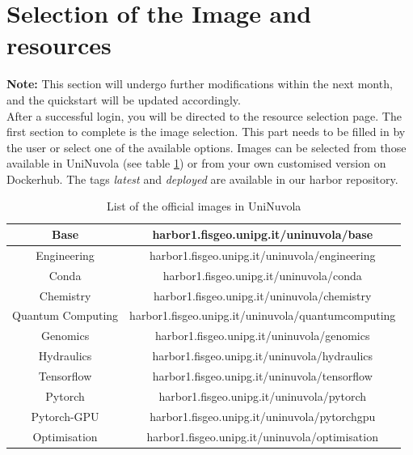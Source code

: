 \section{Selection of the Image and resources}

\textbf{Note:} This section will undergo further modifications within the next month, and the quickstart will be updated
accordingly. \\

After a successful login, you will be directed to the resource selection page. The first section to complete is the
image selection. This part needs to be filled in by the user or select one of the available options. Images can be
selected from those available in UniNuvola (see table \ref{tab:images}) or from your own customised version on
Dockerhub. The tags \textit{latest} and \textit{deployed} are available in our harbor repository.\\

\begin{table}[]
    \caption{List of the official images in UniNuvola}
    \label{tab:images}
    \centering
    \begin{tabular}{|c|c|}
        \hline
        Base              & harbor1.fisgeo.unipg.it/uninuvola/base             \\ \hline
        Engineering       & harbor1.fisgeo.unipg.it/uninuvola/engineering      \\ \hline
        Conda             & harbor1.fisgeo.unipg.it/uninuvola/conda            \\ \hline
        Chemistry         & harbor1.fisgeo.unipg.it/uninuvola/chemistry        \\ \hline
        Quantum Computing & harbor1.fisgeo.unipg.it/uninuvola/quantumcomputing \\ \hline
        Genomics          & harbor1.fisgeo.unipg.it/uninuvola/genomics         \\ \hline
        Hydraulics        & harbor1.fisgeo.unipg.it/uninuvola/hydraulics       \\ \hline
        Tensorflow        & harbor1.fisgeo.unipg.it/uninuvola/tensorflow       \\ \hline
        Pytorch           & harbor1.fisgeo.unipg.it/uninuvola/pytorch          \\ \hline
        Pytorch-GPU       & harbor1.fisgeo.unipg.it/uninuvola/pytorchgpu       \\ \hline
        Optimisation      & harbor1.fisgeo.unipg.it/uninuvola/optimisation     \\ \hline
    \end{tabular}
\end{table}


